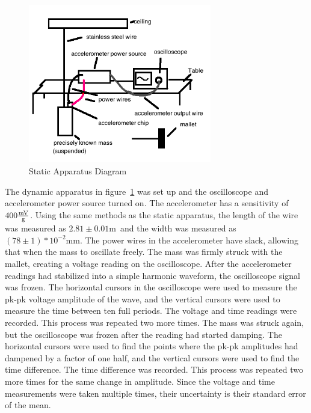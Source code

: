 \documentclass[]{article}
\newcommand{\dynamicWireDiameter}{\ensuremath{(78 \pm 1)*10^{-2} \si{\milli\meter}}}
\newcommand{\dynamicWireLength}{\ensuremath{2.81 \pm 0.01 \si{\meter}}}
\newcommand{\sensitivity}{\ensuremath{400\si{\frac{\milli\volt}{g}}}}
\begin{document}
\begin{figure}[H]
    \center\includegraphics[width=8cm]{../output/diagram2.png}
    \caption{Static Apparatus Diagram}\label{fig:dynamicapparatus}
\end{figure}
The dynamic apparatus in figure~\ref{fig:dynamicapparatus} was set up and the
oscilloscope and accelerometer power source turned on. The accelerometer has a
sensitivity of~\sensitivity. Using the same methods as the static apparatus, the
length of the wire was measured as \dynamicWireLength~and the width was measured
as \dynamicWireDiameter. The power wires in the accelerometer have slack,
allowing that when the mass to oscillate freely. The mass was firmly struck with
the mallet, creating a voltage reading on the oscilloscope. After the
accelerometer readings had stabilized into a simple harmonic waveform, the
oscilloscope signal was frozen. The horizontal cursors in the oscilloscope were
used to measure the pk-pk voltage amplitude of the wave, and the vertical
cursors were used to measure the time between ten full periods.  The voltage and
time readings were recorded. This process was repeated two more times. The mass
was struck again, but the oscilloscope was frozen after the reading had started
damping. The horizontal cursors were used to find the points where the pk-pk
amplitudes had dampened by a factor of one half, and the vertical cursors were
used to find the time difference. The time difference was recorded.  This
process was repeated two more times for the same change in amplitude.  Since the
voltage and time measurements were taken multiple times, their uncertainty is
their standard error of the mean.
\end{document}
